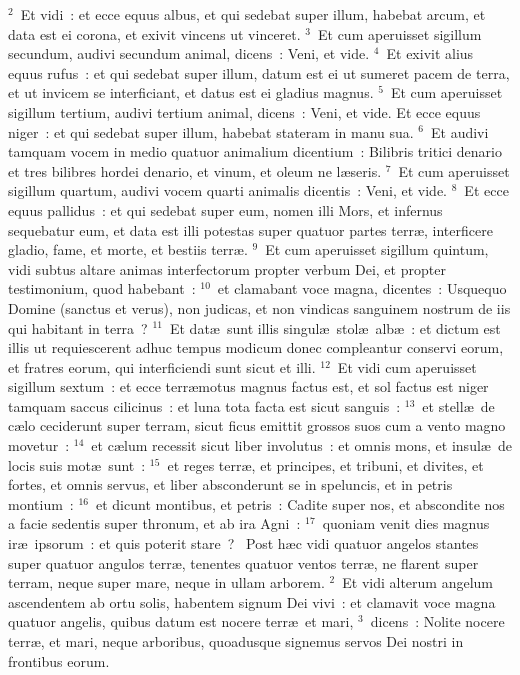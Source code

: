 ${}^{2}$~Et vidi~: et ecce equus albus, et qui sedebat super illum, habebat arcum, et data est ei corona, et exivit vincens ut vinceret.
${}^{3}$~Et cum aperuisset sigillum secundum, audivi secundum animal, dicens~: Veni, et vide.
${}^{4}$~Et exivit alius equus rufus~: et qui sedebat super illum, datum est ei ut sumeret pacem de terra, et ut invicem se interficiant, et datus est ei gladius magnus.
${}^{5}$~Et cum aperuisset sigillum tertium, audivi tertium animal, dicens~: Veni, et vide. Et ecce equus niger~: et qui sedebat super illum, habebat stateram in manu sua.
${}^{6}$~Et audivi tamquam vocem in medio quatuor animalium dicentium~: Bilibris tritici denario et tres bilibres hordei denario, et vinum, et oleum ne l\ae seris.
${}^{7}$~Et cum aperuisset sigillum quartum, audivi vocem quarti animalis dicentis~: Veni, et vide.
${}^{8}$~Et ecce equus pallidus~: et qui sedebat super eum, nomen illi Mors, et infernus sequebatur eum, et data est illi potestas super quatuor partes terr\ae , interficere gladio, fame, et morte, et bestiis terr\ae .
${}^{9}$~Et cum aperuisset sigillum quintum, vidi subtus altare animas interfectorum propter verbum Dei, et propter testimonium, quod habebant~:
${}^{10}$~et clamabant voce magna, dicentes~: Usquequo Domine (sanctus et verus), non judicas, et non vindicas sanguinem nostrum de iis qui habitant in terra~?
${}^{11}$~Et dat\ae\ sunt illis singul\ae\ stol\ae\ alb\ae~: et dictum est illis ut requiescerent adhuc tempus modicum donec compleantur conservi eorum, et fratres eorum, qui interficiendi sunt sicut et illi.
${}^{12}$~Et vidi cum aperuisset sigillum sextum~: et ecce terr\ae motus magnus factus est, et sol factus est niger tamquam saccus cilicinus~: et luna tota facta est sicut sanguis~:
${}^{13}$~et stell\ae\ de c\ae lo ceciderunt super terram, sicut ficus emittit grossos suos cum a vento magno movetur~:
${}^{14}$~et c\ae lum recessit sicut liber involutus~: et omnis mons, et insul\ae\ de locis suis mot\ae\ sunt~:
${}^{15}$~et reges terr\ae , et principes, et tribuni, et divites, et fortes, et omnis servus, et liber absconderunt se in speluncis, et in petris montium~:
${}^{16}$~et dicunt montibus, et petris~: Cadite super nos, et abscondite nos a facie sedentis super thronum, et ab ira Agni~:
${}^{17}$~quoniam venit dies magnus ir\ae\ ipsorum~: et quis poterit stare~?
~\lettrine[lines=10,image=true,loversize=0.05,lraise=-0.03]{P}{}ost h\ae c vidi quatuor angelos stantes super quatuor angulos terr\ae , tenentes quatuor ventos terr\ae , ne flarent super terram, neque super mare, neque in ullam arborem.
${}^{2}$~Et vidi alterum angelum ascendentem ab ortu solis, habentem signum Dei vivi~: et clamavit voce magna quatuor angelis, quibus datum est nocere terr\ae\ et mari,
${}^{3}$~dicens~: Nolite nocere terr\ae , et mari, neque arboribus, quoadusque signemus servos Dei nostri in frontibus eorum.


